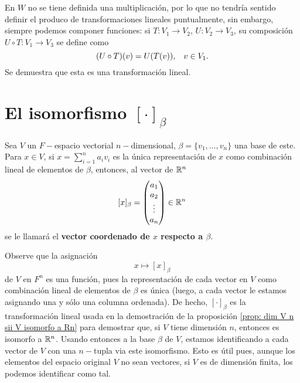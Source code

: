 En $W$ no se tiene definida una multiplicación, por lo que no tendría
sentido definir el produco de transformaciones lineales
puntualmente, sin embargo, siempre podemos componer funciones:
si $T : V_{1} \longrightarrow V_{2}$, $U: V_{2} \longrightarrow V_{3}$,
su composición $ U \circ T : V_{1} \longrightarrow V_{3}$ se define como
\[
(U \circ T)(v) = U(T(v)), \hspace{0.3cm} v \in V_{1}.
\]
Se demuestra que esta es una transformación lineal.

\section{El isomorfismo $[\cdot]_{\beta}$}

\begin{defi}
Sea $V$ un $F-$espacio vectorial
$n-$dimensional, $\beta = \{ v_{1}, \ldots, 
v_{n} \}$ una base de este. Para $x \in V$, si 
$x = \sum_{i=1}^{n}a_{i}v_{i}$ es la única representación de 
$x$ como combinación lineal de elementos de $\beta$, entonces,
al vector de $\mathbb{R}^{n}$
\begin{equation}
	\label{eq: vector coordenado de x}
	[x]_{\beta} = \begin{pmatrix}
a_{1} \\ a_{2} \\ \vdots \\ a_{n}
\end{pmatrix} \in \mathbb{R}^{n}
\end{equation}
se le llamará el \textbf{vector coordenado de $x$ respecto a $\beta$}.
\end{defi}

Observe que la asignación
\[
x \mapsto [x]_{\beta}
\]
de $V$ en $F^{n}$ es una función, pues la representación de
cada vector en $V$ como combinación lineal de elementos de 
$\beta$ es única (luego, a cada vector le estamos asignando una
y sólo una columna ordenada).
De hecho, $[\cdot]_{\beta}$
es la transformación lineal usada en 
la demostración de la proposición
\ref{prop: dim V n sii V isomorfo a Rn} para demostrar que,
si $V$ tiene dimensión $n$, entonces es isomorfo a 
$\mathbb{R}^{n}$. Usando entonces a la base $\beta$ de $V$, estamos
identificando a cada vector de $V$ con una $n-$tupla via
este isomorfismo. Esto es útil pues, aunque los elementos del
espacio original $V$ no sean vectores, si $V$ es
de dimensión finita, los podemos
identificar como tal.

